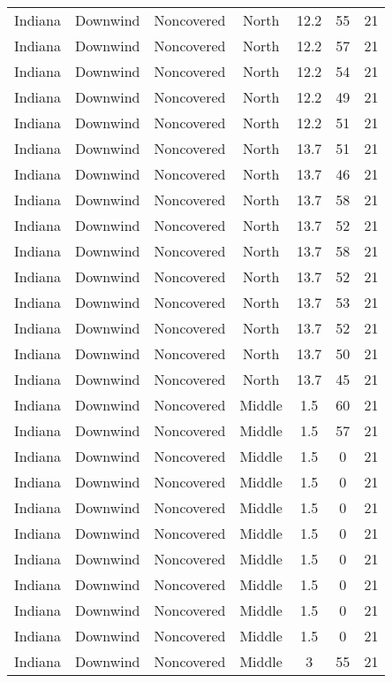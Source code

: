 \documentclass{article}
\begin{document}
\begin{longtable}[H]{ccccccc}
Indiana & Downwind & Noncovered & North  & 12.2 & 55 & 21 \\
Indiana & Downwind & Noncovered & North  & 12.2 & 57 & 21 \\
Indiana & Downwind & Noncovered & North  & 12.2 & 54 & 21 \\
Indiana & Downwind & Noncovered & North  & 12.2 & 49 & 21 \\
Indiana & Downwind & Noncovered & North  & 12.2 & 51 & 21 \\
Indiana & Downwind & Noncovered & North  & 13.7 & 51 & 21 \\
Indiana & Downwind & Noncovered & North  & 13.7 & 46 & 21 \\
Indiana & Downwind & Noncovered & North  & 13.7 & 58 & 21 \\
Indiana & Downwind & Noncovered & North  & 13.7 & 52 & 21 \\
Indiana & Downwind & Noncovered & North  & 13.7 & 58 & 21 \\
Indiana & Downwind & Noncovered & North  & 13.7 & 52 & 21 \\
Indiana & Downwind & Noncovered & North  & 13.7 & 53 & 21 \\
Indiana & Downwind & Noncovered & North  & 13.7 & 52 & 21 \\
Indiana & Downwind & Noncovered & North  & 13.7 & 50 & 21 \\
Indiana & Downwind & Noncovered & North  & 13.7 & 45 & 21 \\
Indiana & Downwind & Noncovered & Middle & 1.5  & 60 & 21 \\
Indiana & Downwind & Noncovered & Middle & 1.5  & 57 & 21 \\
Indiana & Downwind & Noncovered & Middle & 1.5  & 0  & 21 \\
Indiana & Downwind & Noncovered & Middle & 1.5  & 0  & 21 \\
Indiana & Downwind & Noncovered & Middle & 1.5  & 0  & 21 \\
Indiana & Downwind & Noncovered & Middle & 1.5  & 0  & 21 \\
Indiana & Downwind & Noncovered & Middle & 1.5  & 0  & 21 \\
Indiana & Downwind & Noncovered & Middle & 1.5  & 0  & 21 \\
Indiana & Downwind & Noncovered & Middle & 1.5  & 0  & 21 \\
Indiana & Downwind & Noncovered & Middle & 1.5  & 0  & 21 \\
Indiana & Downwind & Noncovered & Middle & 3    & 55 & 21 \\

\end{longtable}
\end{document}
